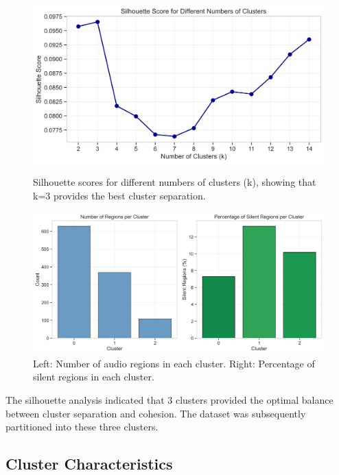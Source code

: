 \documentclass{article}
\begin{document}
\begin{figure}[H]
  \centering
  \begin{minipage}{0.45\textwidth} %
    \centering
    \includegraphics[width=0.8\linewidth]{figures/audio_features/silhouette_scores.png}
    \caption{Silhouette scores for different numbers of clusters (k), showing that k=3 provides the best cluster separation.}
    \label{fig:silhouette}
  \end{minipage} \hspace{0.05\textwidth} %
  \begin{minipage}{0.45\textwidth} %
    \centering
    \includegraphics[width=0.8\linewidth]{figures/audio_features/cluster_composition.png}
    \caption{Left: Number of audio regions in each cluster. Right: Percentage of silent regions in each cluster.}
    \label{fig:cluster_comp}
  \end{minipage}
\end{figure}

The silhouette analysis indicated that 3 clusters provided the optimal balance between cluster separation and cohesion. The dataset was subsequently partitioned into these three clusters.

\subsection{Cluster Characteristics}
\end{document}
